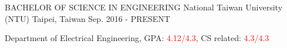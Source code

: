

\begin{cventries}

  \cventry
    {BACHELOR OF SCIENCE IN ENGINEERING } %
    {National Taiwan University (NTU) } %
    {Taipei, Taiwan} %
    {Sep. 2016 - PRESENT} %
    {
      \begin{cvitems} %
        \item {Department of Electrical Engineering, GPA: \textcolor{red}{4.12/4.3}, CS related: \textcolor{red}{4.3/4.3} }
      \end{cvitems}
    }

\end{cventries}
